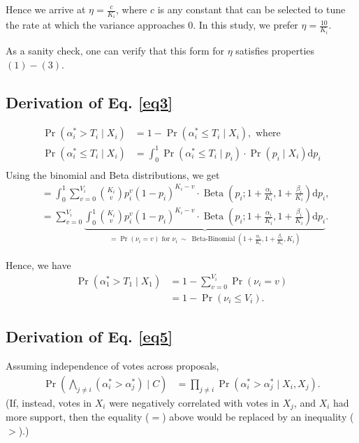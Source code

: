 \documentclass[chi_draft]{sigchi}
\begin{document}
Hence we arrive at $\eta = \frac{c}{K_i}$, where $c$ is any constant that can be selected to tune the rate at which the variance approaches $0$.  In this study, we prefer $\eta = \frac{10}{K_i}$.

As a sanity check, one can verify that this form for $\eta$ satisfies properties $(1)-(3)$.

\subsection{Derivation of Eq. \eqref{eq3}}
\begin{align*}
\Pr(\alpha^*_i > T_i \mid X_i) &= 1 - \Pr(\alpha^*_i \leq T_i \mid X_i), \text{ where}\\
\Pr(\alpha^*_i \leq T_i \mid X_i) &= \int_0^1 \Pr(\alpha^*_i \leq T_i \mid p_i)\cdot \Pr(p_i \mid X_i) \mathrm{d}p_i\\
\end{align*}
Using the binomial and Beta distributions, we get
\begin{align*}
&= \int_0^1 \sum\limits_{v=0}^{V_i} {K_i \choose v} p_i^{v} {(1-p_i)}^{K_i-v} \cdot \operatorname{Beta}(p_i; 1+\frac{\alpha_i}{K_i},1+\frac{\beta_i}{K_i}) \mathrm{d}p_i,\\
&= \sum\limits_{v=0}^{V_i} \underbrace{\int_0^1 {K_i \choose v} p_i^{v} {(1-p_i)}^{K_i-v} \cdot \operatorname{Beta}(p_i; 1+\frac{\alpha_i}{K_i},1+\frac{\beta_i}{K_i}) \mathrm{d}p_i}_{= \Pr(\nu_i = v)\text{ for } \nu_i\ \sim\ \operatorname{Beta-Binomial}(1+\frac{\alpha_i}{K_i},1+\frac{\beta_i}{K_i}, K_i)}.
\end{align*}

Hence, we have
\begin{align*}
\Pr(\alpha^*_1 > T_1 \mid X_1) &= 1 - \sum\limits_{v=0}^{V_i} \Pr(\nu_i = v)\\
&= 1 - \Pr(\nu_i \leq V_i).
\end{align*}

\subsection{Derivation of Eq. \eqref{eq5}}
Assuming independence of votes across proposals,
\begin{align*}
\Pr\left(\bigwedge_{j \neq i} (\alpha^*_i > \alpha^*_j) \mid C\right) &=\prod_{j \neq i} \Pr(\alpha^*_i > \alpha^*_j \mid X_i, X_j).
\end{align*}
(If, instead, votes in $X_i$ were negatively correlated with votes in $X_j$, and $X_i$ had more support, then the equality ($=$) above would be replaced by an inequality ($>$).)
\end{document}
